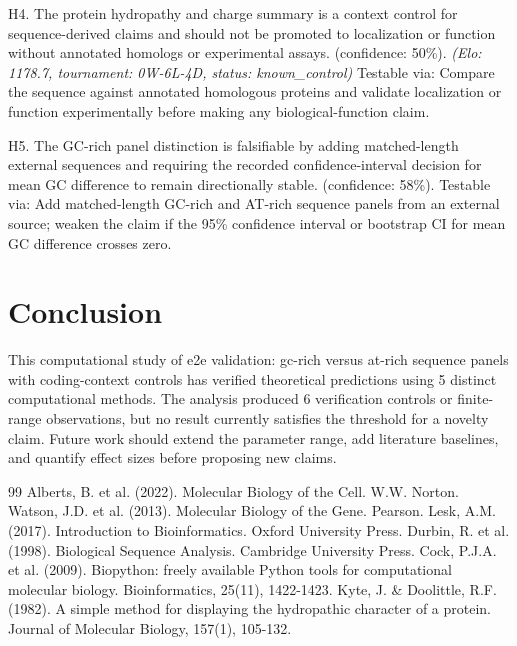 \documentclass[11pt,a4paper]{article}
\begin{document}
H4. The protein hydropathy and charge summary is a context control for sequence-derived claims and should not be promoted to localization or function without annotated homologs or experimental assays. (confidence: 50\%). \textit{(Elo: 1178.7, tournament: 0W-6L-4D, status: known\_control)} Testable via: Compare the sequence against annotated homologous proteins and validate localization or function experimentally before making any biological-function claim.

H5. The GC-rich panel distinction is falsifiable by adding matched-length external sequences and requiring the recorded confidence-interval decision for mean GC difference to remain directionally stable. (confidence: 58\%). Testable via: Add matched-length GC-rich and AT-rich sequence panels from an external source; weaken the claim if the 95\% confidence interval or bootstrap CI for mean GC difference crosses zero.


\section{Conclusion}
This computational study of e2e validation: gc-rich versus at-rich sequence panels with coding-context controls has verified theoretical predictions using 5 distinct computational methods. The analysis produced 6 verification controls or finite-range observations, but no result currently satisfies the threshold for a novelty claim. Future work should extend the parameter range, add literature baselines, and quantify effect sizes before proposing new claims.


\begin{thebibliography}{99}
 Alberts, B. et al. (2022). Molecular Biology of the Cell. W.W. Norton.
 Watson, J.D. et al. (2013). Molecular Biology of the Gene. Pearson.
 Lesk, A.M. (2017). Introduction to Bioinformatics. Oxford University Press.
 Durbin, R. et al. (1998). Biological Sequence Analysis. Cambridge University Press.
 Cock, P.J.A. et al. (2009). Biopython: freely available Python tools for computational molecular biology. Bioinformatics, 25(11), 1422-1423.
 Kyte, J. \& Doolittle, R.F. (1982). A simple method for displaying the hydropathic character of a protein. Journal of Molecular Biology, 157(1), 105-132.
\end{thebibliography}
\end{document}
